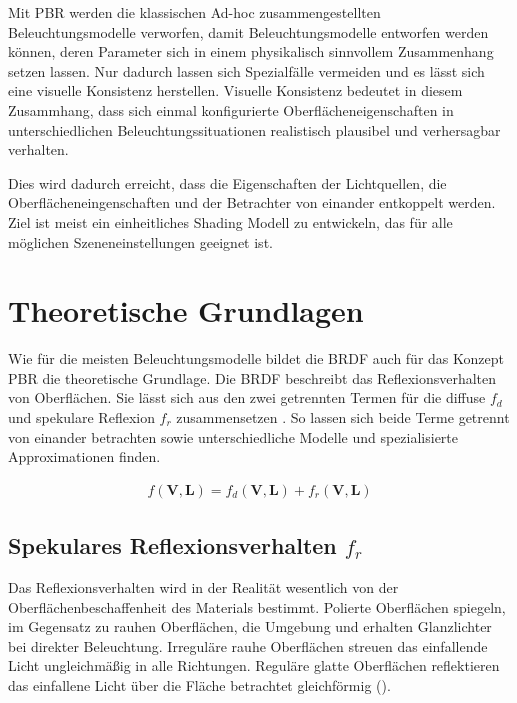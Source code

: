 Mit \ac{PBR} werden die klassischen Ad-hoc zusammengestellten Beleuchtungsmodelle verworfen, damit Beleuchtungsmodelle entworfen werden können, deren Parameter sich in einem physikalisch sinnvollem Zusammenhang setzen lassen. Nur dadurch lassen sich Spezialfälle vermeiden und es lässt sich eine visuelle Konsistenz herstellen. Visuelle Konsistenz bedeutet in diesem Zusammhang, dass sich einmal konfigurierte Oberflächeneigenschaften in unterschiedlichen Beleuchtungssituationen realistisch plausibel und verhersagbar verhalten. 

Dies wird dadurch erreicht, dass die Eigenschaften der Lichtquellen, die Oberflächeneingenschaften und der Betrachter von einander entkoppelt werden. Ziel ist meist ein einheitliches Shading Modell zu entwickeln, das für alle möglichen Szeneneinstellungen geeignet ist.

\section{Theoretische Grundlagen}
\label{sec:pbr-grundlagen}

Wie für die meisten Beleuchtungsmodelle bildet die \ac{BRDF} auch für das Konzept \ac{PBR} die theoretische Grundlage. Die \ac{BRDF} beschreibt das Reflexionsverhalten von Oberflächen. Sie lässt sich aus den zwei getrennten Termen für die diffuse $f_d$ und spekulare Reflexion $f_r$ zusammensetzen \parencite[Kapitel 3.1.2, Seite 7]{Rousiers2014}. So lassen sich beide Terme getrennt von einander betrachten sowie unterschiedliche Modelle und spezialisierte Approximationen finden.

\begin{align}
	\label{eq:brdf-dekonstruiert}
	f(\mathbf V,\mathbf L) = f_d(\mathbf V,\mathbf L) + f_r(\mathbf V,\mathbf L)
\end{align}

\subsection[Spekulares Reflexionsverhalten]{Spekulares Reflexionsverhalten $f_r$}
Das Reflexionsverhalten wird in der Realität wesentlich von der Oberflächenbeschaffenheit des Materials bestimmt. Polierte Oberflächen spiegeln, im Gegensatz zu rauhen Oberflächen, die Umgebung und erhalten Glanzlichter bei direkter Beleuchtung. Irreguläre rauhe Oberflächen streuen das einfallende Licht ungleichmäßig in alle Richtungen. Reguläre glatte Oberflächen reflektieren das einfallene Licht über die Fläche betrachtet gleichförmig ().

